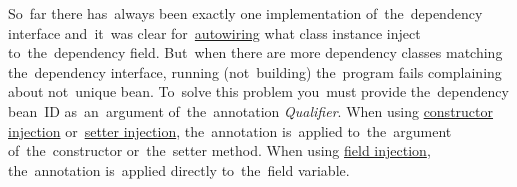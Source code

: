 So~far there has~always been exactly one implementation of~the~dependency interface and~it~was clear for~\hyperref[autowiring]{autowiring} what class instance inject to~the~dependency field. But~when there are more dependency classes matching the~dependency interface, running (not~building) the~program fails complaining about not~unique bean. To~solve this problem you~must provide the~dependency bean~ID as~an~argument of~the~annotation \textit{Qualifier}. When using \hyperref[constructorinjectionautowire]{constructor injection} or~\hyperref[setterinjectionautowire]{setter injection}, the~annotation is~applied to~the~argument of~the~constructor or~the~setter method. When using \hyperref[fieldinjection]{field injection}, the~annotation is~applied directly to~the~field variable.

